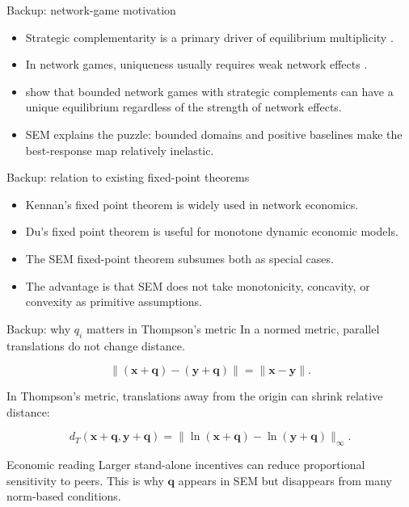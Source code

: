 \documentclass[11pt,aspectratio=169]{beamer}
\theoremstyle{plain}
\theoremstyle{definition}
\newenvironment{wideitemize}
  {\begin{itemize}\setlength{\itemsep}{0.72em}}
  {\end{itemize}}
\newcommand{\mainbutton}[2]{\hyperlink{#1}{\beamerreturnbutton{#2}}}
\newcommand{\q}{\mathbf{q}}
\newcommand{\x}{\mathbf{x}}
\newcommand{\y}{\mathbf{y}}
\newcommand{\0}{\mathbf{0}}
\begin{document}
\begin{frame}[label=backup-network-puzzle]{Backup: network-game motivation}
\small
\begin{wideitemize}
    \item Strategic complementarity is a primary driver of equilibrium multiplicity
    \citep{cooper1988coordinating}.
    \item In network games, uniqueness usually requires weak network effects
    \citep{ballester2006s,bramoulle2014strategic}.
    \item \citet{belhaj2014network} show that bounded network games with strategic complements
    can have a unique equilibrium regardless of the strength of network effects.
    \item SEM explains the puzzle: bounded domains and positive baselines make the best-response
    map relatively inelastic.
\end{wideitemize}

\vspace{0.5em}
\mainbutton{main-absolute-relative}{Back}
\end{frame}

\begin{frame}{Backup: relation to existing fixed-point theorems}
\begin{wideitemize}
    \item Kennan's fixed point theorem is widely used in network economics.
    \item Du's fixed point theorem is useful for monotone dynamic economic models.
    \item The SEM fixed-point theorem subsumes both as special cases.
    \item The advantage is that SEM does not take monotonicity, concavity, or convexity
    as primitive assumptions.
\end{wideitemize}
\end{frame}

\begin{frame}{Backup: why $q_i$ matters in Thompson's metric}
In a normed metric, parallel translations do not change distance.

\[
\|(\x+\q)-(\y+\q)\|=\|\x-\y\|.
\]

In Thompson's metric, translations away from the origin can shrink relative distance:

\[
d_T(\x+\q,\y+\q)
=
\|\ln(\x+\q)-\ln(\y+\q)\|_\infty.
\]

\begin{block}{Economic reading}
Larger stand-alone incentives can reduce proportional sensitivity to peers.
This is why $\q$ appears in SEM but disappears from many norm-based conditions.
\end{block}
\end{frame}
\end{document}
